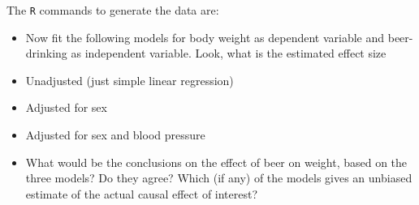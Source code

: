 \documentclass[
]{book}
\newenvironment{Shaded}{\begin{snugshade}}{\end{snugshade}}
\newcommand{\AttributeTok}[1]{\textcolor[rgb]{0.13,0.29,0.53}{#1}}
\newcommand{\CommentTok}[1]{\textcolor[rgb]{0.56,0.35,0.01}{\textit{#1}}}
\newcommand{\DecValTok}[1]{\textcolor[rgb]{0.00,0.00,0.81}{#1}}
\newcommand{\FloatTok}[1]{\textcolor[rgb]{0.00,0.00,0.81}{#1}}
\newcommand{\FunctionTok}[1]{\textcolor[rgb]{0.13,0.29,0.53}{\textbf{#1}}}
\newcommand{\NormalTok}[1]{#1}
\newcommand{\OtherTok}[1]{\textcolor[rgb]{0.56,0.35,0.01}{#1}}
\newcommand{\SpecialCharTok}[1]{\textcolor[rgb]{0.81,0.36,0.00}{\textbf{#1}}}
\begin{document}
The \texttt{R} commands to generate the data are:

\begin{Shaded}
\end{Shaded}

\begin{itemize}
\item
  Now fit the following models for body weight as dependent variable and beer-drinking as independent variable. Look, what is the estimated effect size
\item
  Unadjusted (just simple linear regression)
\item
  Adjusted for sex
\item
  Adjusted for sex and blood pressure
\item
  What would be the conclusions on the effect of beer on weight, based on the three models? Do they agree? Which (if any) of the models gives an unbiased estimate of the actual causal effect of interest?
\end{itemize}
\end{document}
